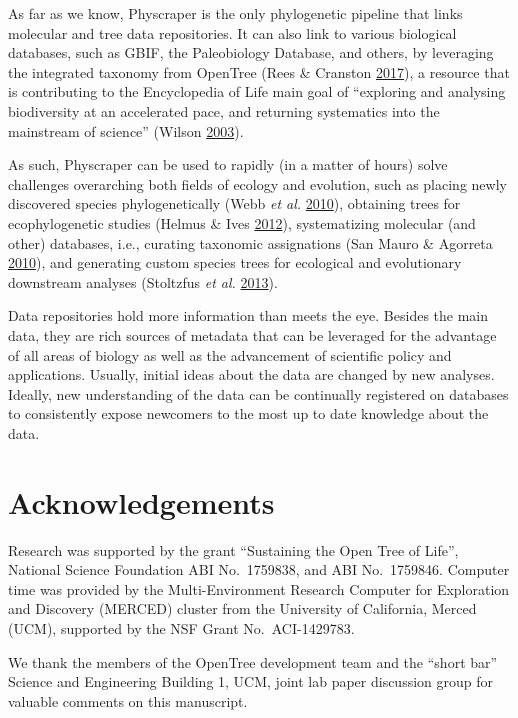 \documentclass[]{article}
\begin{document}
As far as we know, Physcraper is the only phylogenetic pipeline that links molecular and tree data repositories.
It can also link to various biological databases, such as GBIF, the Paleobiology Database, and others, by leveraging the integrated taxonomy from OpenTree (Rees \& Cranston \protect\hyperlink{ref-rees2017automated}{2017}), a resource that is contributing to the Encyclopedia of Life main goal of ``exploring and analysing biodiversity at an accelerated pace, and returning systematics into the mainstream of science'' (Wilson \protect\hyperlink{ref-wilson2003encyclopedia}{2003}).

As such, Physcraper can be used to rapidly (in a matter of hours)
solve challenges overarching both fields of ecology and evolution, such as
placing newly discovered species phylogenetically (Webb \emph{et al.} \protect\hyperlink{ref-webb2010biodiversity}{2010}),
obtaining trees for ecophylogenetic studies (Helmus \& Ives \protect\hyperlink{ref-helmus2012phylogenetic}{2012}),
systematizing molecular (and other) databases, i.e., curating taxonomic assignations (San Mauro \& Agorreta \protect\hyperlink{ref-san2010molecular}{2010}),
and generating custom species trees for ecological and evolutionary downstream analyses (Stoltzfus \emph{et al.} \protect\hyperlink{ref-stoltzfus2013phylotastic}{2013}).

Data repositories hold more information than meets the eye.
Besides the main data, they are rich sources of metadata that can be leveraged for the advantage of all areas of biology as well as the advancement of scientific policy and applications.
Usually, initial ideas about the data are changed by new analyses.
Ideally, new understanding of the data can be continually registered on databases
to consistently expose newcomers to the most up to date knowledge about the data.

\hypertarget{acknowledgements}{%
\section{Acknowledgements}\label{acknowledgements}}

Research was supported by the grant ``Sustaining the Open Tree of Life'', National Science Foundation ABI No.~1759838, and ABI No.~1759846.
Computer time was provided by the Multi-Environment Research Computer for Exploration and Discovery (MERCED) cluster from the University of California, Merced (UCM), supported by the NSF Grant No.~ACI-1429783.

We thank the members of the OpenTree development team and the ``short bar'' Science and Engineering Building 1, UCM, joint lab paper discussion group for valuable comments on this manuscript.
\end{document}
